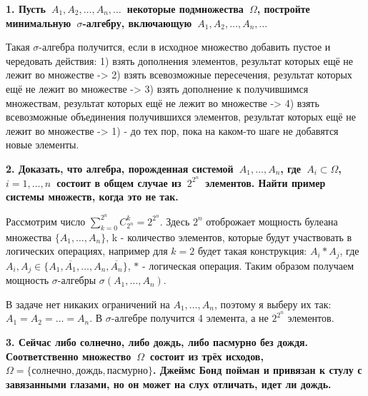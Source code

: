 \documentclass{article}
\begin{document}
\noindent \textbf{1. Пусть $A_1, A_2, \dots, A_n, \dots$ некоторые подмножества $\Omega$, постройте минимальную $\sigma$-алгебру, включающую $A_1, A_2, …, A_n, …$}

Такая $\sigma$-алгебра получится, если в исходное множество добавить пустое и чередовать действия: 1) взять дополнения элементов, результат которых ещё не лежит во множестве -> 2) взять всевозможные пересечения, результат которых ещё не лежит во множестве -> 3) взять дополнение к получившимся множествам, результат которых ещё не лежит во множестве -> 4) взять всевозможные объединения получившихся элементов, результат которых ещё не лежит во множестве -> 1) - до тех пор, пока на каком-то шаге не добавятся новые элементы. 

\noindent \textbf{2. Доказать, что алгебра, порожденная системой $A_1, \dots, A_n$, где $A_i \subset \Omega$,  $i=1,\dots,n$ состоит в общем случае из $2^{2^n}$ элементов. Найти пример системы множеств, когда это не так.}

\vspace{3mm}

Рассмотрим число $\sum_{k=0}^{2^n}C_{2^n}^k = 2^{2^n}$. Здесь $2^n$ отоброжает мощность булеана множества $\{A_1, \dots, A_n\}$, k - количество элементов, которые будут участвовать в логических операциях, например для $k=2$ будет такая конструкция: $A_i*A_j$, где $A_i, A_j \in \{A_1, \overline{A_1}, \dots, A_n, \overline{A_n}\}$, $*$ - логическая операция. Таким образом получаем мощность $\sigma$-алгебры  $\sigma(A_1, \dots, A_n)$.

В задаче нет никаких ограничений на $A_1, \dots, A_n$, поэтому я выберу их так: $A_1 = A_2 =\dots=A_n$. В $\sigma$-алгебре получится 4 элемента, а не  $2^{2^n}$ элементов.

\noindent \textbf{3. Сейчас либо солнечно, либо дождь, либо пасмурно без дождя. Соответственно множество $\Omega$ состоит из трёх исходов, $\Omega = \{солнечно, дождь, пасмурно\}$. Джеймс Бонд пойман и привязан к стулу с завязанными глазами, но он может на слух отличать, идет ли дождь.}
\end{document}
